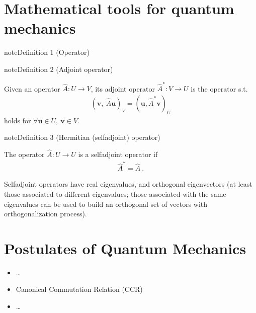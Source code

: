 \documentclass[letterpaper,10pt,english]{jupyterBook}
\begin{document}
\section{Mathematical tools for quantum mechanics}
\label{\detokenize{ch/quantum-mechanics/intro:mathematical-tools-for-quantum-mechanics}}\label{ch/quantum-mechanics/intro:Operator}
\begin{sphinxadmonition}{note}{Definition 1 (Operator)}


\end{sphinxadmonition}
\label{ch/quantum-mechanics/intro:Adjoint Operator}
\begin{sphinxadmonition}{note}{Definition 2 (Adjoint operator)}



\sphinxAtStartPar
Given an operator \(\hat{A}: U \rightarrow V\), its adjoint operator \(\hat{A}^*: V \rightarrow U\) is the operator s.t.
\begin{equation*}
\begin{split}(\mathbf{v}, \ \hat{A} \mathbf{u})_{V} = (\mathbf{u}, \hat{A}^* \mathbf{v} )_{U}\end{split}
\end{equation*}
\sphinxAtStartPar
holds for \(\forall \mathbf{u} \in U, \ \mathbf{v} \in V\).
\end{sphinxadmonition}
\label{ch/quantum-mechanics/intro:Self-Adjoint Operator}
\begin{sphinxadmonition}{note}{Definition 3 (Hermitian (self\sphinxhyphen{}adjoint) operator)}



\sphinxAtStartPar
The operator \(\hat{A}: U \rightarrow U\) is a self\sphinxhyphen{}adjoint operator if
\begin{equation*}
\begin{split}\hat{A}^* = \hat{A} \ .\end{split}
\end{equation*}\end{sphinxadmonition}

\sphinxAtStartPar
Self\sphinxhyphen{}adjoint operators have real eigenvalues, and orthogonal eigenvectors (at least those associated to different eigenvalues; those associated with the same eigenvalues can be used to build an orthogonal set of vectors with orthogonalization process).


\section{Postulates of Quantum Mechanics}
\label{\detokenize{ch/quantum-mechanics/intro:postulates-of-quantum-mechanics}}\begin{itemize}
\item {} 
\sphinxAtStartPar
…

\item {} 
\sphinxAtStartPar
Canonical Commutation Relation (CCR) 

\item {} 
\sphinxAtStartPar
…

\end{itemize}
\end{document}
